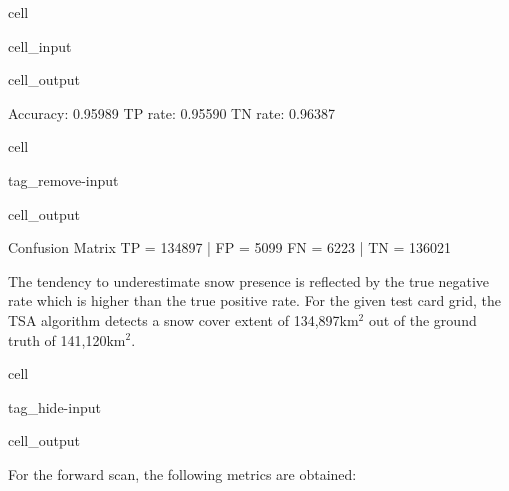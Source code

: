 \documentclass[letterpaper,10pt,english]{jupyterBook}
\begin{document}
\begin{sphinxuseclass}{cell}
\begin{sphinxVerbatimInput}
\begin{sphinxuseclass}{cell_input}
\end{sphinxuseclass}\end{sphinxVerbatimInput}
\begin{sphinxVerbatimOutput}

\begin{sphinxuseclass}{cell_output}
\begin{sphinxVerbatim}[commandchars=\\\{\}]
Accuracy: 0.95989
TP rate:  0.95590
TN rate:  0.96387
\end{sphinxVerbatim}

\end{sphinxuseclass}\end{sphinxVerbatimOutput}

\end{sphinxuseclass}
\begin{sphinxuseclass}{cell}
\begin{sphinxuseclass}{tag_remove-input}\begin{sphinxVerbatimOutput}

\begin{sphinxuseclass}{cell_output}
\begin{sphinxVerbatim}[commandchars=\\\{\}]
Confusion Matrix
TP =  134897  |  FP =  5099
FN =  6223    |  TN =  136021
\end{sphinxVerbatim}

\end{sphinxuseclass}\end{sphinxVerbatimOutput}

\end{sphinxuseclass}
\end{sphinxuseclass}
\sphinxAtStartPar
The tendency to underestimate snow presence is reflected by the true negative rate which is higher than the true positive rate.
For the given test card grid, the TSA algorithm detects a snow cover extent of 134,897km$^{\text{2}}$ out of the ground truth of 141,120km$^{\text{2}}$.

\begin{sphinxuseclass}{cell}
\begin{sphinxuseclass}{tag_hide-input}\begin{sphinxVerbatimOutput}

\begin{sphinxuseclass}{cell_output}
\noindent{}

\end{sphinxuseclass}\end{sphinxVerbatimOutput}

\end{sphinxuseclass}
\end{sphinxuseclass}
\sphinxAtStartPar
For the forward scan, the following metrics are obtained:
\end{document}
